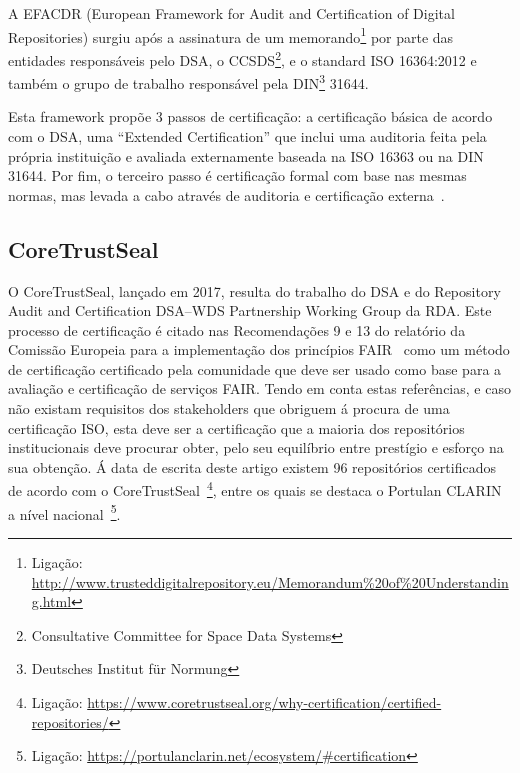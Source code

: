 \documentclass[sigconf,nonacm]{acmart}
\begin{document}
A EFACDR (European Framework for Audit and Certification of Digital Repositories) surgiu após a assinatura de um memorando\footnote{Ligação: \url{http://www.trusteddigitalrepository.eu/Memorandum\%20of\%20Understanding.html}} por parte das entidades responsáveis pelo DSA, o CCSDS\footnote{Consultative Committee for Space Data Systems}, e o standard ISO 16364:2012 e também o grupo de trabalho responsável pela DIN\footnote{Deutsches Institut für Normung} 31644.

Esta framework propõe 3 passos de certificação: a certificação básica de acordo com o DSA, uma ``Extended Certification'' que inclui uma auditoria feita pela própria instituição e avaliada externamente baseada na ISO 16363 ou na DIN 31644. Por fim, o terceiro passo é certificação formal com base nas mesmas normas, mas levada a cabo através de auditoria e certificação externa~\cite{Lindlar_Schwab_2019}.


\subsection{CoreTrustSeal} %
\label{sub:core_trust_seal}

O CoreTrustSeal, lançado em 2017, resulta do trabalho do DSA e do Repository Audit and Certification DSA–WDS Partnership Working Group da RDA.
%
Este processo de certificação é citado nas Recomendações 9 e 13 do relatório da Comissão Europeia para a implementação dos princípios FAIR~\cite{hodson2018turning} como um método de certificação certificado pela comunidade que deve ser usado como base para a avaliação e certificação de serviços FAIR. Tendo em conta estas referências, e caso não existam requisitos dos stakeholders que obriguem á procura de uma certificação ISO, esta deve ser a certificação que a maioria dos repositórios institucionais deve procurar obter, pelo seu equilíbrio entre prestígio e esforço na sua obtenção.
%
Á data de escrita deste artigo existem 96 repositórios certificados de acordo com o CoreTrustSeal~\footnote{Ligação: \url{https://www.coretrustseal.org/why-certification/certified-repositories/}}, entre os quais se destaca o Portulan CLARIN a nível nacional~\footnote{Ligação: \url{https://portulanclarin.net/ecosystem/\#certification}}.


\end{document}
